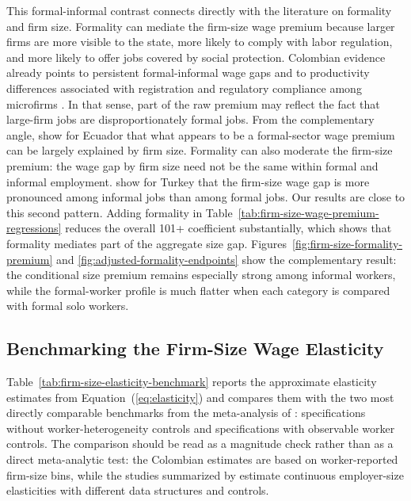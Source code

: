 This formal-informal contrast connects directly with the literature on formality and firm size. Formality can mediate the firm-size wage premium because larger firms are more visible to the state, more likely to comply with labor regulation, and more likely to offer jobs covered by social protection. Colombian evidence already points to persistent formal-informal wage gaps and to productivity differences associated with registration and regulatory compliance among microfirms \citep{DazaGamboa2013,GutierrezRodriguezLesmes2023}. In that sense, part of the raw premium may reflect the fact that large-firm jobs are disproportionately formal jobs. From the complementary angle, \citet{ElBadaouiStroblWalsh2010} show for Ecuador that what appears to be a formal-sector wage premium can be largely explained by firm size. Formality can also moderate the firm-size premium: the wage gap by firm size need not be the same within formal and informal employment. \citet{BalkanTumen2016} show for Turkey that the firm-size wage gap is more pronounced among informal jobs than among formal jobs. Our results are close to this second pattern. Adding formality in Table~\ref{tab:firm-size-wage-premium-regressions} reduces the overall 101+ coefficient substantially, which shows that formality mediates part of the aggregate size gap. Figures~\ref{fig:firm-size-formality-premium} and \ref{fig:adjusted-formality-endpoints} show the complementary result: the conditional size premium remains especially strong among informal workers, while the formal-worker profile is much flatter when each category is compared with formal solo workers.

\subsection{Benchmarking the Firm-Size Wage Elasticity}
\label{subsec:elasticity-benchmark}

Table~\ref{tab:firm-size-elasticity-benchmark} reports the approximate
elasticity estimates from Equation~(\ref{eq:elasticity}) and compares them with
the two most directly comparable benchmarks from the meta-analysis of
\citet{DiegmannMullerSchoefer2026}: specifications without worker-heterogeneity
controls and specifications with observable worker controls. The comparison
should be read as a magnitude check rather than as a direct meta-analytic test:
the Colombian estimates are based on worker-reported firm-size bins, while the
studies summarized by \citet{DiegmannMullerSchoefer2026} estimate continuous
employer-size elasticities with different data structures and controls.

